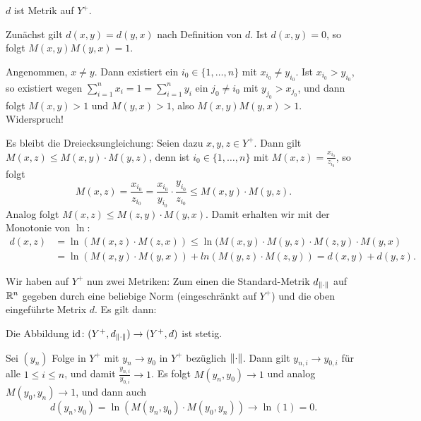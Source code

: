 \begin{lemma}
	\label{lemma:13.12}
	$d$ ist Metrik auf $Y^+$.
\end{lemma}

\begin{beweis}
	Zunächst gilt $d(x,y) = d(y,x)$ nach Definition von $d$.
	Ist $d(x,y) = 0$, so folgt $M(x,y)M(y,x) = 1$.
	
	Angenommen, $x \neq y$.
	Dann existiert ein $i_0 \in \{1,\dots,n\}$ mit $x_{i_0} \neq y_{i_0}$.
	Ist $x_{i_0} > y_{i_0}$, so existiert wegen $\sum_{i=1}^{n} x_i = 1 = \sum_{i=1}^{n} y_i$ ein $j_0 \neq i_0$ mit $y_{j_0} > x_{j_0}$, und dann folgt $M(x,y) > 1$ und $M(y,x) > 1$, also $M(x,y)M(y,x) > 1$.
	Widerspruch!
	
	Es bleibt die Dreiecksungleichung:
	Seien dazu $x,y,z \in Y^+$.
	Dann gilt $M(x,z) \leq M(x,y) \cdot M(y,z)$, denn ist $i_0 \in \{1,\dots,n\}$ mit $M(x,z) = \frac{x_{i_0}}{z_{i_0}}$, so folgt
	\[
		M(x,z) = \frac{x_{i_0}}{z_{i_0}} = \frac{x_{i_0}}{y_{i_0}} \cdot \frac{y_{i_0}}{z_{i_0}} \leq M(x,y) \cdot M(y,z).
	\]
	Analog folgt $M(x,z) \leq M(z,y) \cdot M(y,x)$.
	Damit erhalten wir mit der Monotonie von $\ln$:
	\begin{align*}
		d(x,z) &= \ln(M(x,z) \cdot M(z,x)) \leq \ln(M(x,y)\cdot M(y,z) \cdot M(z,y) \cdot M(y,x) \\
		&= \ln(M(x,y) \cdot M(y,x)) + ln(M(y,z) \cdot M(z,y)) = d(x,y) + d(y,z). 
	\end{align*}
\end{beweis}

Wir haben auf $Y^+$ nun zwei Metriken:
Zum einen die Standard-Metrik $d_{\left\lVert\cdot\right\rVert}$ auf $\mathbb{R}^n$ gegeben durch eine beliebige Norm (eingeschränkt auf $Y^+$) und die oben eingeführte Metrix $d$.
Es gilt dann:
   
\begin{lemma}
	\label{lemma:13.14}
	Die Abbildung $\operatorname{id}\colon (Y^+,d_{\left\lVert\cdot\right\rVert}) \rightarrow (Y^+,d)$ ist stetig.
\end{lemma}

\begin{beweis}
	Sei $(y_n)$ Folge in $Y^+$ mit $y_n \rightarrow y_0$ in $Y^+$ bezüglich $\left\lVert\cdot\right\rVert$.
	Dann gilt $y_{n,i} \rightarrow y_{0,i}$ für alle $1 \leq i \leq n$, und damit $\frac{y_{n,i}}{y_{0,i}} \rightarrow 1$.
	Es folgt $M(y_n,y_0) \rightarrow 1$ und analog $M(y_0,y_n) \rightarrow 1$, und dann auch
	\[
		d(y_n,y_0) = \ln(M(y_n,y_0) \cdot M(y_0,y_n)) \rightarrow \ln(1) = 0. 
	\]
\end{beweis}

